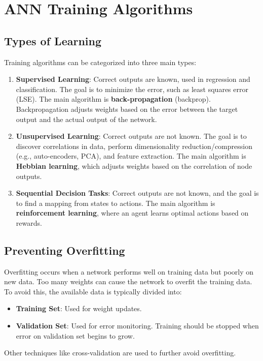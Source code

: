 \section{ANN Training Algorithms}
\subsection*{Types of Learning}
Training algorithms can be categorized into three main types:
\begin{enumerate}
    \item \textbf{Supervised Learning}: Correct outputs are known, used in regression and classification. The goal is to minimize the error, such as least squares error (LSE). The main algorithm is \textbf{back-propagation} (backprop). Backpropagation adjusts weights based on the error between the target output and the actual output of the network.
   \item \textbf{Unsupervised Learning}: Correct outputs are not known. The goal is to discover correlations in data, perform dimensionality reduction/compression (e.g., auto-encoders, PCA), and feature extraction. The main algorithm is \textbf{Hebbian learning}, which adjusts weights based on the correlation of node outputs.
    \item \textbf{Sequential Decision Tasks}:  Correct outputs are not known, and the goal is to find a mapping from states to actions. The main algorithm is \textbf{reinforcement learning}, where an agent learns optimal actions based on rewards.
\end{enumerate}

\subsection*{Preventing Overfitting}
Overfitting occurs when a network performs well on training data but poorly on new data. Too many weights can cause the network to overfit the training data. To avoid this, the available data is typically divided into:
\begin{itemize}
    \item \textbf{Training Set}: Used for weight updates.
    \item \textbf{Validation Set}: Used for error monitoring. Training should be stopped when error on validation set begins to grow.
\end{itemize}
Other techniques like cross-validation are used to further avoid overfitting.

